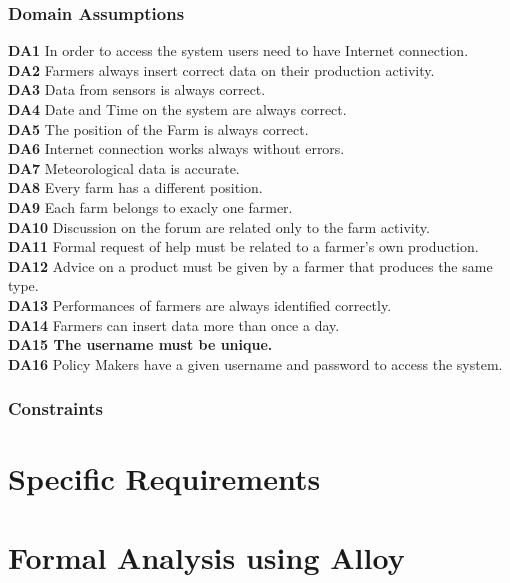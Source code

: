 \documentclass{article}
\begin{document}
\subsubsection{Domain Assumptions}
\textbf{DA1} In order to access the system users need to have Internet connection.\\
\textbf{DA2} Farmers always insert correct data on their production activity.\\
\textbf{DA3} Data from sensors is always correct.\\
\textbf{DA4} Date and Time on the system are always correct.\\
\textbf{DA5} The position of the Farm is always correct.\\
\textbf{DA6} Internet connection works always without errors.\\
\textbf{DA7} Meteorological data is accurate.\\
\textbf{DA8} Every farm has a different position.\\
\textbf{DA9} Each farm belongs to exacly one farmer.\\
\textbf{DA10} Discussion on the forum are related only to the farm activity.\\
\textbf{DA11} Formal request of help must be related to a farmer's own production.\\
\textbf{DA12} Advice on a product must be given by a farmer that produces the same type.\\
\textbf{DA13} Performances of farmers are always identified correctly.\\
\textbf{DA14} Farmers can insert data more than once a day.\\
\textbf{DA15 The username must be unique.}\\
\textbf{DA16} Policy Makers have a given username and password to access the system.

\subsubsection{Constraints}


\section{Specific Requirements}

\section{Formal Analysis using Alloy}
\end{document}
